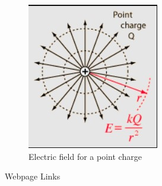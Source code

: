 \documentclass[a4paper, 12pt]{article}
\begin{document}
\begin{figure}[h]
	{\begin{center}
		\includegraphics[scale=0.4]{ME20b021.jpg}
	\end{center}}
	\caption{Electric field for a point charge~\cite{picture}}
	\label{f1:image1}
\end{figure}

Webpage Links ~\cite{website}



%
%
\end{document}
